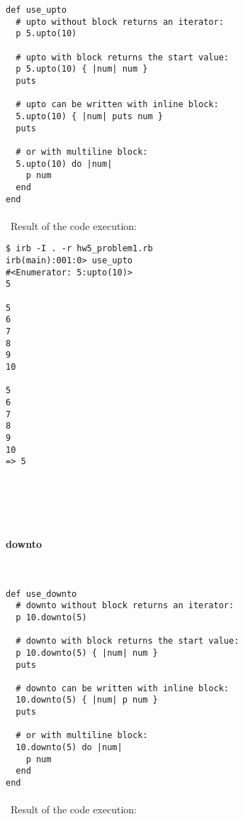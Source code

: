 \documentclass{article}
\begin{document}
\begin{verbatim}
def use_upto
  # upto without block returns an iterator:
  p 5.upto(10)

  # upto with block returns the start value:
  p 5.upto(10) { |num| num }
  puts

  # upto can be written with inline block:
  5.upto(10) { |num| puts num }
  puts

  # or with multiline block:
  5.upto(10) do |num|
    p num
  end
end
\end{verbatim}

\paragraph{}\
Result of the code execution:

\begin{verbatim} 
$ irb -I . -r hw5_problem1.rb
irb(main):001:0> use_upto
#<Enumerator: 5:upto(10)>
5

5
6
7
8
9
10

5
6
7
8
9
10
=> 5
\end{verbatim}

\paragraph{}\
\paragraph{}\


\paragraph{ downto}\

\begin{verbatim}
def use_downto
  # downto without block returns an iterator:
  p 10.downto(5)

  # downto with block returns the start value:
  p 10.downto(5) { |num| num }
  puts

  # downto can be written with inline block:
  10.downto(5) { |num| p num }
  puts

  # or with multiline block:
  10.downto(5) do |num|
    p num
  end
end
\end{verbatim}

\paragraph{}\
Result of the code execution:
\end{document}
